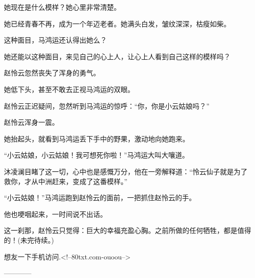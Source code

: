 \begin{this_body}
她现在是什么模样？她心里非常清楚。

她已经青春不再，成为一个年迈老者。她满头白发，皱纹深深，枯瘦如柴。

这种面目，马鸿运还认得出她么？

她还能以这种面目，来见自己的心上人，让心上人看到自己这样的模样吗？

赵怜云忽然丧失了浑身的勇气。

她低下头，甚至不敢去正视马鸿运的双眼。

赵怜云正迟疑间，忽然听到马鸿运的惊呼：“你，你是小云姑娘吗？”

赵怜云浑身一震。

她抬起头，就看到马鸿运丢下手中的野果，激动地向她跑来。

“小云姑娘，小云姑娘！我可想死你啦！”马鸿运大叫大嚷道。

沐凌澜目睹了这一切，心中也是感慨万分，他在一旁解释道：“怜云仙子就是为了救你，才从中洲赶来，变成了这番模样。”

“小云姑娘！”马鸿运跑到赵怜云的面前，一把抓住赵怜云的手。

他也哽咽起来，一时间说不出话。

这一刹那，赵怜云只觉得：巨大的幸福充盈心胸。之前所做的任何牺牲，都是值得的！(未完待续。)

想友一下手机访问.<!--80txt.com-ouoou-->

------------

\end{this_body}

